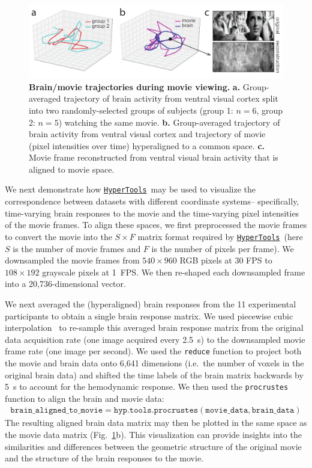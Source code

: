 \documentclass[12pt,letterpaper]{article}
\newcommand{\hypertools}{\href{https://github.com/ContextLab/hypertools}{\texttt{HyperTools}}}
\begin{document}
\begin{figure}[tbp]
\centering
\includegraphics[width=\textwidth]{raiders}
\caption{\textbf{Brain/movie trajectories during movie viewing.} \textbf{a.} Group-averaged trajectory of brain activity from ventral visual cortex split into two randomly-selected groups of subjects (group 1: $n=6$, group 2: $n=5$) watching the same movie. \textbf{b.} Group-averaged trajectory of brain activity from ventral visual cortex and trajectory of movie (pixel intensities over time) hyperaligned to a common space. \textbf{c.} Movie frame reconstructed from ventral visual brain activity that is aligned to movie space.}
\label{fig:raiders}
\end{figure}

We next demonstrate how \hypertools~may be used to visualize the correspondence between datasets with different coordinate systems-- specifically, time-varying brain responses to the movie and the time-varying pixel intensities of the movie frames.  To align these spaces, we first preprocessed the movie frames to convert the movie into the $S \times F$ matrix format required by \hypertools~(here $S$ is the number of movie frames and $F$ is the number of pixels per frame).  We downsampled the movie frames from $540 \times 960$ RGB pixels at 30 FPS to $108 \times 192$ grayscale pixels at 1~FPS.  We then re-shaped each downsampled frame into a 20,736-dimensional vector.

We next averaged the (hyperaligned) brain responses from the 11 experimental participants to obtain a single brain response matrix.  We used piecewise cubic interpolation~\cite{FritCarl80} to re-sample this averaged brain response matrix from the original data acquisition rate (one image acquired every 2.5~s) to the downsampled movie frame rate (one image per second).  We used the \texttt{reduce} function to project both the movie and brain data onto 6,641 dimensions (i.e.\ the number of voxels in the original brain data) and shifted the time labels of the brain matrix backwards by 5~s to account for the hemodynamic response.  We then used the \texttt{procrustes} function to align the brain and movie data:
\begin{align}
\mathtt{brain\_aligned\_to\_movie = hyp.tools.procrustes(movie\_data, brain\_data)}
\end{align}
The resulting aligned brain data matrix may then be plotted in the same space as the movie data matrix (Fig.~\ref{fig:raiders}b).  This visualization can provide insights into the similarities and differences between the geometric structure of the original movie and the structure of the brain responses to the movie.
\end{document}
